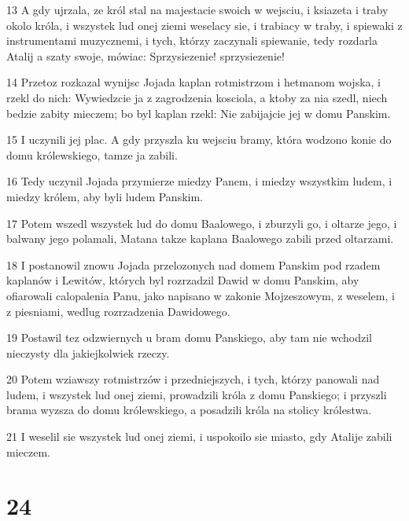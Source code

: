 \par 13 A gdy ujrzala, ze król stal na majestacie swoich w wejsciu, i ksiazeta i traby okolo króla, i wszystek lud onej ziemi weselacy sie, i trabiacy w traby, i spiewaki z instrumentami muzycznemi, i tych, którzy zaczynali spiewanie, tedy rozdarla Atalij a szaty swoje, mówiac: Sprzysiezenie! sprzysiezenie!
\par 14 Przetoz rozkazal wynijsc Jojada kaplan rotmistrzom i hetmanom wojska, i rzekl do nich: Wywiedzcie ja z zagrodzenia kosciola, a ktoby za nia szedl, niech bedzie zabity mieczem; bo byl kaplan rzekl: Nie zabijajcie jej w domu Panskim.
\par 15 I uczynili jej plac. A gdy przyszla ku wejsciu bramy, która wodzono konie do domu królewskiego, tamze ja zabili.
\par 16 Tedy uczynil Jojada przymierze miedzy Panem, i miedzy wszystkim ludem, i miedzy królem, aby byli ludem Panskim.
\par 17 Potem wszedl wszystek lud do domu Baalowego, i zburzyli go, i oltarze jego, i balwany jego polamali, Matana takze kaplana Baalowego zabili przed oltarzami.
\par 18 I postanowil znowu Jojada przelozonych nad domem Panskim pod rzadem kaplanów i Lewitów, których byl rozrzadzil Dawid w domu Panskim, aby ofiarowali calopalenia Panu, jako napisano w zakonie Mojzeszowym, z weselem, i z piesniami, wedlug rozrzadzenia Dawidowego.
\par 19 Postawil tez odzwiernych u bram domu Panskiego, aby tam nie wchodzil nieczysty dla jakiejkolwiek rzeczy.
\par 20 Potem wziawszy rotmistrzów i przedniejszych, i tych, którzy panowali nad ludem, i wszystek lud onej ziemi, prowadzili króla z domu Panskiego; i przyszli brama wyzsza do domu królewskiego, a posadzili króla na stolicy królestwa.
\par 21 I weselil sie wszystek lud onej ziemi, i uspokoilo sie miasto, gdy Atalije zabili mieczem.

\chapter{24}

